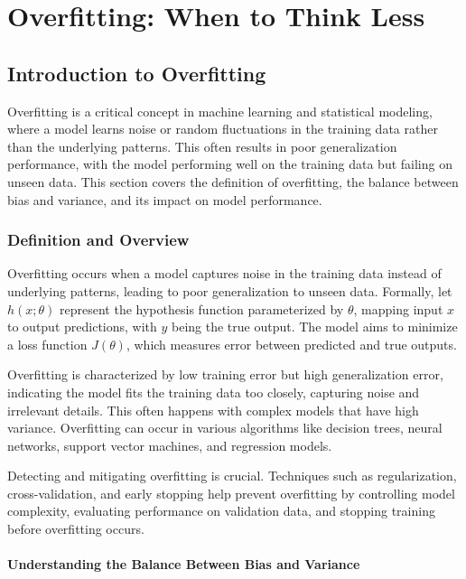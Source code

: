 \documentclass[12pt]{book} %
\begin{document}
\chapter{Overfitting: When to Think Less}

\section{Introduction to Overfitting}

Overfitting is a critical concept in machine learning and statistical modeling, where a model learns noise or random fluctuations in the training data rather than the underlying patterns. This often results in poor generalization performance, with the model performing well on the training data but failing on unseen data. This section covers the definition of overfitting, the balance between bias and variance, and its impact on model performance.

\subsection{Definition and Overview}

Overfitting occurs when a model captures noise in the training data instead of underlying patterns, leading to poor generalization to unseen data. Formally, let \(h(x; \theta)\) represent the hypothesis function parameterized by \(\theta\), mapping input \(x\) to output predictions, with \(y\) being the true output. The model aims to minimize a loss function \(J(\theta)\), which measures error between predicted and true outputs.

Overfitting is characterized by low training error but high generalization error, indicating the model fits the training data too closely, capturing noise and irrelevant details. This often happens with complex models that have high variance. Overfitting can occur in various algorithms like decision trees, neural networks, support vector machines, and regression models.

Detecting and mitigating overfitting is crucial. Techniques such as regularization, cross-validation, and early stopping help prevent overfitting by controlling model complexity, evaluating performance on validation data, and stopping training before overfitting occurs.

\subsubsection{Understanding the Balance Between Bias and Variance}
\end{document}
